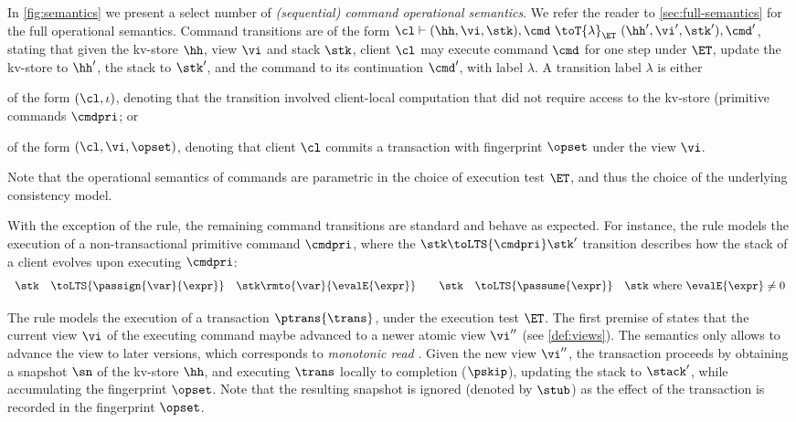 In \cref{fig:semantics} we present a select number of \emph{(sequential) command operational semantics}.
We refer the reader to \cref{sec:full-semantics} for the full operational semantics.
Command transitions are of the form $\cl \vdash (\hh, \vi, \stk), \cmd \ \toT{\lambda}_{\ET} \ (\hh', \vi', \stk') , \cmd'$, 
stating that given the kv-store $\hh$, view $\vi$ and stack $\stk$, client $\cl$ may execute command $\cmd$ for one step under $\ET$, update the kv-store to $\hh'$, the stack to $\stk'$, and the command to its continuation $\cmd'$, with label $\lambda$.
A transition label $\lambda$ is either
\begin{enumerate*}
	\item of the form $(\cl, \iota)$, denoting that the transition involved 
client-local computation that did not require access to the kv-store (\eg primitive commands $\cmdpri$; or
	\item of the form $(\cl, \vi, \opset)$, denoting that client $\cl$ commits a transaction with fingerprint $\opset$ under the view $\vi$.
\end{enumerate*}
Note that the operational semantics of commands are parametric in the choice of execution test $\ET$, 
and thus the choice of the underlying consistency model.


With the exception of the  rule, the remaining command transitions are standard and behave as expected. 
For instance, the  rule models the execution of a non-transactional primitive command $\cmdpri$, where the $\stk \toLTS{\cmdpri} \stk'$ transition describes how the stack of a client evolves upon executing $\cmdpri$:
\[
\begin{array}{rcl @{\qquad} rcl}
\stk  & \toLTS{\passign{\var}{\expr}} & \stk\rmto{\var}{\evalE{\expr}} &
\stk  & \toLTS{\passume{\expr}} & \stk \text{ where } \evalE{\expr} \neq 0 \\
\end{array}                                                                                               
\]

The  rule models the execution of a transaction $\ptrans{\trans}$, under the execution test $\ET$. 
The first premise of  states that the current view $\vi$ of the executing command maybe advanced to a newer atomic view $\vi''$ (see \cref{def:views}). 
The semantics only allows to advance the view to later versions, which corresponds to \emph{monotonic read} \cite{.......}.
Given the new view $\vi''$, the transaction proceeds by obtaining a snapshot $\sn$ of the kv-store $\hh$, and executing $\trans$ locally to completion ($\pskip$), updating the stack to $\stack'$, while accumulating the fingerprint $\opset$. Note that the resulting snapshot is ignored (denoted by $\stub$) as the effect of the transaction is recorded in the fingerprint $\opset$. 
%

